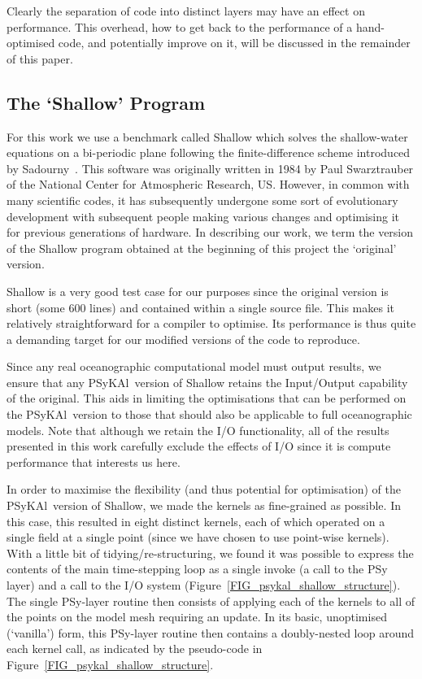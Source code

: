 \documentclass{IOS-Book-Article}
\newcommand{\psykal}{{PS}y{KA}l\ }
\begin{document}
Clearly the separation of code into distinct layers may have an effect
on performance. This overhead, how to get back to the performance
of a hand-optimised code, and potentially improve on it, will be
discussed in the remainder of this paper.

\subsection*{The `Shallow' Program}

For this work we use a benchmark called Shallow which solves the
shallow-water equations on a bi-periodic plane following the
finite-difference scheme introduced by Sadourny~\cite{sadourny75}.
This software was originally written in 1984 by Paul Swarztrauber of
the National Center for Atmospheric Research, US.  However, in common
with many scientific codes, it has subsequently undergone some sort of
evolutionary development with subsequent people making various changes
and optimising it for previous generations of hardware.  In describing
our work, we term the version of the Shallow program obtained at the
beginning of this project the `original' version.

Shallow is a very good test case for our purposes since the original
version is short (some 600 lines) and contained within a single source
file. This makes it relatively straightforward for a compiler to
optimise. Its performance is thus quite a demanding target for our
modified versions of the code to reproduce.

Since any real oceanographic computational model must output results,
we ensure that any \psykal version of Shallow retains the Input/Output
capability of the original. This aids in limiting the optimisations
that can be performed on the \psykal version to those that should also
be applicable to full oceanographic models. Note that although we
retain the I/O functionality, all of the results presented in this work
carefully exclude the effects of I/O since it is compute performance
that interests us here.

In order to maximise the flexibility (and thus potential for
optimisation) of the \psykal version of Shallow, we made the kernels
as fine-grained as possible. In this case, this resulted in eight
distinct kernels, each of which operated on a single field at a single
point (since we have chosen to use point-wise kernels). With a little
bit of tidying/re-structuring, we found it was possible to express the
contents of the main time-stepping loop as a single invoke (a call to
the PSy layer) and a call to the I/O system
(Figure~\ref{FIG_psykal_shallow_structure}). The single PSy-layer
routine then consists of applying each of the kernels to all of the
points on the model mesh requiring an update. In its basic,
unoptimised (`vanilla') form, this PSy-layer routine then contains a
doubly-nested loop around each kernel call, as indicated by the
pseudo-code in Figure~\ref{FIG_psykal_shallow_structure}.
\end{document}
